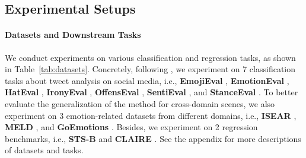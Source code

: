 \documentclass[letterpaper]{article} %
\begin{document}
\subsection{Experimental Setups}

\paragraph{Datasets and Downstream Tasks}
We conduct experiments on various classification and regression tasks, as shown in Table~\ref{tab:datasets}.
Concretely, following \citet{DBLP:conf/emnlp/BarbieriCAN20}, we experiment on 7 classification tasks about tweet analysis on social media, i.e.,
\textbf{EmojiEval} \cite{DBLP:conf/semeval/BarbieriCRABBPS18},
\textbf{EmotionEval} \cite{DBLP:conf/semeval/MohammadBSK18},
\textbf{HatEval} \cite{DBLP:conf/semeval/BasileBFNPPRS19},
\textbf{IronyEval} \cite{DBLP:conf/semeval/HeeLH18},
\textbf{OffensEval} \cite{DBLP:conf/semeval/ZampieriMNRFK19},
\textbf{SentiEval} \cite{DBLP:conf/semeval/RosenthalRNS14},
and \textbf{StanceEval} \cite{DBLP:conf/semeval/MohammadKSZC16}.
To better evaluate the generalization of the method for cross-domain scenes, we also experiment on 3 emotion-related datasets from different domains, i.e., \textbf{ISEAR} \cite{scherer1994evidence},
\textbf{MELD} \cite{DBLP:conf/acl/PoriaHMNCM19},
and
\textbf{GoEmotions} \cite{DBLP:conf/acl/DemszkyMKCNR20}.
Besides, we experiment on 2 regression benchmarks, i.e., \textbf{STS-B} \cite{DBLP:conf/semeval/CerDALS17} and \textbf{CLAIRE} \cite{DBLP:conf/semeval/RothAS22}.
See the appendix for more descriptions of datasets and tasks.
\end{document}
